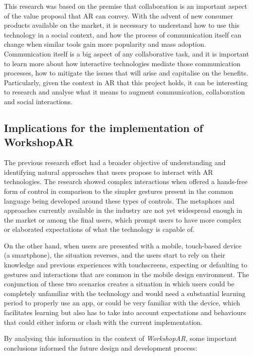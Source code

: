 This research was based on the premise that collaboration is an important aspect of the value proposal that \ac{AR} can convey. With the advent of new consumer products
available on the market, it is necessary to understand how to use this technology in a social context, and how the process of communication itself can change when similar
tools gain more popularity and mass adoption. Communication itself is a big aspect of any collaborative task, and it is important to learn more about how interactive
technologies mediate those communication processes, how to mitigate the issues that will arise and capitalise on the benefits. Particularly, given the context in \ac{AR}
that this project holds, it can be interesting to research and analyse what it means to augment communication, collaboration and social interactions.

\subsection{Implications for the implementation of WorkshopAR \label{sec:5-1-2}}

The previous research effort had a broader objective of understanding and identifying natural approaches that users propose to interact with \ac{AR} technologies. The research
showed complex interactions when offered a hands-free form of control in comparison to the simpler gestures present in the common language being developed around these
types of controls. The metaphors and approaches currently available in the industry are not yet widespread enough in the market or among the final users, which prompt
users to have more complex or elaborated expectations of what the technology is capable of.

On the other hand, when users are presented with a mobile, touch-based device (a smartphone), the situation reverses, and the users start to rely on their knowledge and
previous experiences with touchscreens, expecting or defaulting to gestures and interactions that are common in the mobile design environment. The conjunction of these two
scenarios creates a situation in which users could be completely unfamiliar with the technology and would need a substantial learning period to properly use an app, or
could be very familiar with the device, which facilitates learning but also has to take into account expectations and behaviours that could either inform or clash with the
current implementation.

By analysing this information in the context of \emph{WorkshopAR}, some important conclusions informed the future design and development process:

